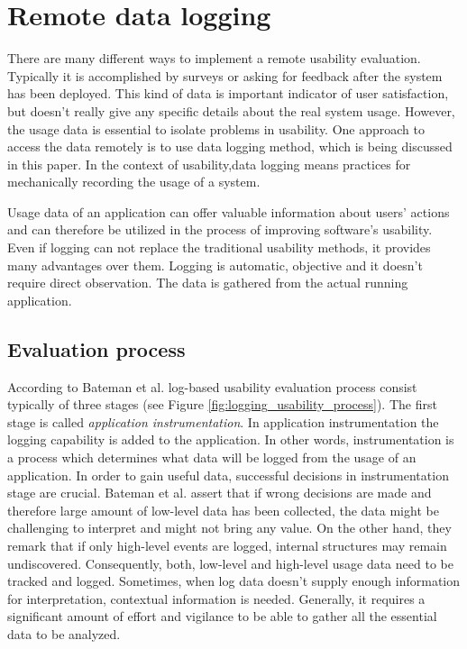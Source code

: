 \documentclass[12pt,a4paper,oneside,pdftex]{report}
\begin{document}
\section{Remote data logging}
\label{sec:rue}

There are many different ways to implement a remote usability evaluation. Typically it is accomplished by surveys or asking for feedback after the system has been deployed. This kind of data is important indicator of user satisfaction, but doesn't really give any specific details about the real system usage. However, the usage data is essential to isolate problems in usability. One approach to access the data remotely is to use data logging method, which is being discussed in this paper. In the context of usability,data logging means practices for mechanically recording the usage of a system. \cite{RefWorks:31}

Usage data of an application can offer valuable information about users' actions and can therefore be utilized in the process of improving software's usability. Even if logging can not replace the traditional usability methods, it provides many advantages over them.  Logging is automatic, objective and it doesn't require direct observation. The data is gathered from the actual running application. \cite{RefWorks:24}	


\subsection{Evaluation process} 

According to Bateman et al. \cite{RefWorks:24} log-based usability evaluation process consist typically of three stages (see Figure \ref{fig:logging_usability_process}). The first stage is called \emph{application instrumentation}. In application instrumentation the logging capability is added to the application. In other words, instrumentation is a process which determines what data will be logged from the usage of an application. In order to gain useful data, successful decisions in instrumentation stage are crucial. Bateman et al. assert that if wrong decisions are made and therefore large amount of low-level data has been collected, the data might be challenging to interpret and might not bring any value. On the other hand, they remark that if only high-level events are logged, internal structures may remain undiscovered. Consequently, both, low-level and high-level usage data need to be tracked and logged. Sometimes, when log data doesn't supply enough information for interpretation, contextual information is needed. Generally, it requires a significant amount of effort and vigilance to be able to gather all the essential data to be analyzed. \cite{RefWorks:24}
\end{document}
